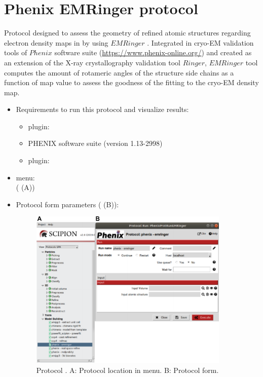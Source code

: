 \section{Phenix EMRinger protocol}
\label{app:emRingerProtocol}%
Protocol designed to assess the geometry of refined atomic structures regarding electron density maps in \scipion by using $EMRinger$ \citep{barad2015}. Integrated in cryo-EM validation tools of $Phenix$ software suite (\url{https://www.phenix-online.org/}) and created as an extension of the X-ray crystallography validation tool $Ringer$, $EMRinger$ tool computes the amount of rotameric angles of the structure side chains as a function of map value to assess the goodness of the fitting to the cryo-EM density map.\\

\begin{itemize}
 \item Requirements to run this protocol and visualize results:
    \begin{itemize}
        \item \scipion plugin: 
        \item PHENIX software suite (version 1.13-2998)
        \item \scipion plugin: 
    \end{itemize}
 \item \scipion menu:\\
   ( (A))\\
  
 \item Protocol form parameters ( (B)):\\
  
    \begin{figure}[H]
     \centering 
     \captionsetup{width=.7\linewidth} 
     \includegraphics[width=0.90\textwidth]{Images_appendix/Fig139.pdf}
     \caption{Protocol . A: Protocol location in \scipion menu. B: Protocol form.}
     \label{fig:app_protocol_emringer_1}
    \end{figure}


\end{itemize}
